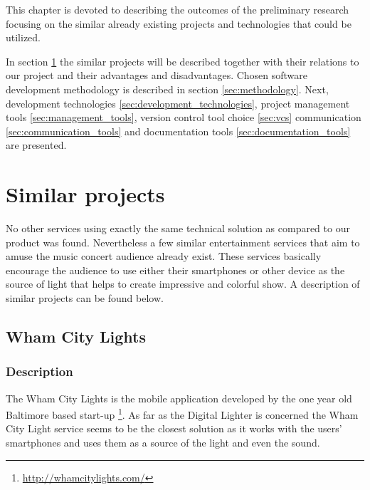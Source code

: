 \label{chap:preliminary_studies}
This chapter is devoted to describing the outcomes of the preliminary research focusing on the similar already existing projects and technologies that could be utilized.

In section \ref{sec:similar_projects} the similar projects will be described together with their relations to our project and their advantages and disadvantages.
Chosen software development methodology is described in section \ref{sec:methodology}.
Next, development technologies \ref{sec:development_technologies}, project management tools \ref{sec:management_tools}, version control tool choice \ref{sec:vcs} communication \ref{sec:communication_tools} and documentation tools \ref{sec:documentation_tools} are presented.


\section{Similar projects} \label{sec:similar_projects}
No other services using exactly the same technical solution as compared to our product was found.
Nevertheless a few similar entertainment services that aim to amuse the music concert audience already exist. 
These services basically encourage the audience to use either their smartphones or other device as the source of light that helps to create impressive and colorful show.
A description of similar projects can be found below.


\subsection{Wham City Lights}

\subsubsection{Description}
The Wham City Lights is the mobile application developed by the one year old Baltimore based start-up \footnote{\url{http://whamcitylights.com/}}. 
As far as the Digital Lighter is concerned the Wham City Light service seems to be the closest solution as it works with the users' smartphones and uses them as a source of the light and even the sound.

